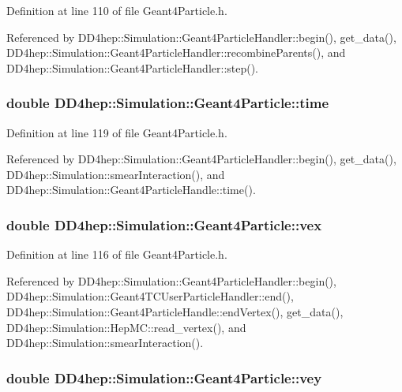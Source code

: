 Definition at line 110 of file Geant4Particle.h.

Referenced by DD4hep::Simulation::Geant4ParticleHandler::begin(), get\_\-data(), DD4hep::Simulation::Geant4ParticleHandler::recombineParents(), and DD4hep::Simulation::Geant4ParticleHandler::step().\hypertarget{class_d_d4hep_1_1_simulation_1_1_geant4_particle_a01f4419807130fecc3a596659115fd00}{
\subsubsection[{time}]{\setlength{\rightskip}{0pt plus 5cm}double {\bf DD4hep::Simulation::Geant4Particle::time}}}
\label{class_d_d4hep_1_1_simulation_1_1_geant4_particle_a01f4419807130fecc3a596659115fd00}


Definition at line 119 of file Geant4Particle.h.

Referenced by DD4hep::Simulation::Geant4ParticleHandler::begin(), get\_\-data(), DD4hep::Simulation::smearInteraction(), and DD4hep::Simulation::Geant4ParticleHandle::time().\hypertarget{class_d_d4hep_1_1_simulation_1_1_geant4_particle_a28b83040272870e04caff34da5846464}{
\subsubsection[{vex}]{\setlength{\rightskip}{0pt plus 5cm}double {\bf DD4hep::Simulation::Geant4Particle::vex}}}
\label{class_d_d4hep_1_1_simulation_1_1_geant4_particle_a28b83040272870e04caff34da5846464}


Definition at line 116 of file Geant4Particle.h.

Referenced by DD4hep::Simulation::Geant4ParticleHandler::begin(), DD4hep::Simulation::Geant4TCUserParticleHandler::end(), DD4hep::Simulation::Geant4ParticleHandle::endVertex(), get\_\-data(), DD4hep::Simulation::HepMC::read\_\-vertex(), and DD4hep::Simulation::smearInteraction().\hypertarget{class_d_d4hep_1_1_simulation_1_1_geant4_particle_a1befe26ea99280bd0a57d6d858165ef6}{
\subsubsection[{vey}]{\setlength{\rightskip}{0pt plus 5cm}double {\bf DD4hep::Simulation::Geant4Particle::vey}}}
\label{class_d_d4hep_1_1_simulation_1_1_geant4_particle_a1befe26ea99280bd0a57d6d858165ef6}


